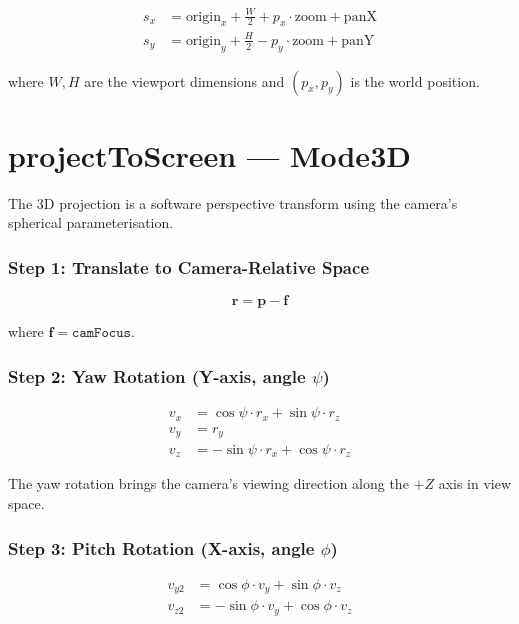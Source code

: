 \begin{align}
  s_x &= \text{origin}_x + \frac{W}{2} + p_x \cdot \text{zoom} + \text{panX} \\
  s_y &= \text{origin}_y + \frac{H}{2} - p_y \cdot \text{zoom} + \text{panY}
\end{align}

where $W, H$ are the viewport dimensions and $(p_x, p_y)$ is the world
position.

\section{projectToScreen --- Mode3D}

The 3D projection is a software perspective transform using the
camera's spherical parameterisation.

\subsubsection{Step 1: Translate to Camera-Relative Space}

\begin{equation}
\mathbf{r} = \mathbf{p} - \mathbf{f}
\end{equation}

where $\mathbf{f} = \texttt{camFocus}$.

\subsubsection{Step 2: Yaw Rotation (Y-axis, angle $\psi$)}

\begin{align}
v_x &=  \cos\psi \cdot r_x + \sin\psi \cdot r_z \\
v_y &= r_y \\
v_z &= -\sin\psi \cdot r_x + \cos\psi \cdot r_z
\end{align}

The yaw rotation brings the camera's viewing direction along the $+Z$ axis
in view space.

\subsubsection{Step 3: Pitch Rotation (X-axis, angle $\phi$)}

\begin{align}
v_{y2} &=  \cos\phi \cdot v_y + \sin\phi \cdot v_z \\
v_{z2} &= -\sin\phi \cdot v_y + \cos\phi \cdot v_z
\end{align}

